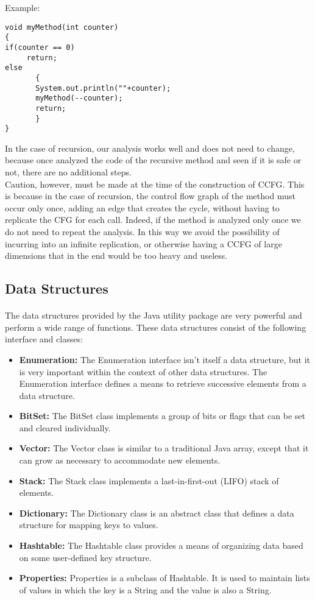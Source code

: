 \documentclass[letterpaper,twocolumn,10pt]{article}
\begin{document}
Example:
\begin{verbatim}
void myMethod(int counter)
{
if(counter == 0)
     return;
else
       {
       System.out.println(""+counter);
       myMethod(--counter);
       return;
       }
}
\end{verbatim}

In the case of recursion, our analysis works well and does not need to change, because once analyzed the code of the recursive method and seen if it is safe or not, there are no additional steps.\\
Caution, however, must be made at the time of the construction of CCFG. This is because in the case of recursion, the control flow graph of the method must occur only once, adding an edge that creates the cycle, without having to replicate the CFG for each call. Indeed, if the method is analyzed only once we do not need to repeat the analysis. In this way we avoid the possibility of incurring into an infinite replication, or otherwise having a CCFG of large dimensions that in the end would be too heavy and useless.

\subsection{Data Structures}
\paragraph{}
The data structures provided by the Java utility package are very powerful and perform a wide range of functions. These data structures consist of the following interface and classes:

\begin{itemize}
\item \textbf{Enumeration:} The Enumeration interface isn't itself a data structure, but it is very important within the context of other data structures. The Enumeration interface defines a means to retrieve successive elements from a data structure.
\item \textbf{BitSet:} The BitSet class implements a group of bits or flags that can be set and cleared individually.
\item \textbf{Vector:} The Vector class is similar to a traditional Java array, except that it can grow as necessary to accommodate new elements.
\item \textbf{Stack:} The Stack class implements a last-in-first-out (LIFO) stack of elements.
\item \textbf{Dictionary:} The Dictionary class is an abstract class that defines a data structure for mapping keys to values.
\item \textbf{Hashtable:} The Hashtable class provides a means of organizing data based on some user-defined key structure.
\item \textbf{Properties:} Properties is a subclass of Hashtable. It is used to maintain lists of values in which the key is a String and the value is also a String.
\end{itemize}
\end{document}
